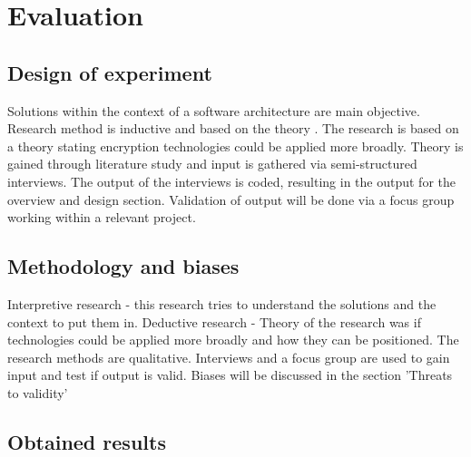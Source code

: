 \chapter{Evaluation}\label{s:evaluation}

\section{Design of experiment}
Solutions within the context of a software architecture are main objective. Research method is inductive and based on the theory . The research is based on a theory stating encryption technologies
could be applied more broadly. Theory is gained through literature study and input is gathered via semi-structured interviews. The output of the interviews is coded, resulting in the output for the overview and design section. Validation of output will be done via a focus group working within a relevant project.

\section{Methodology and biases}
Interpretive research - this research tries to understand the solutions and the context to put them in. 
Deductive research - Theory of the research was if technologies could be applied more broadly and how they can be positioned.
The research methods are qualitative. Interviews and a focus group are used to gain input and test if output is valid. Biases will be discussed in the section 'Threats to validity'

\section{Obtained results}
\lipsum[1-1]





